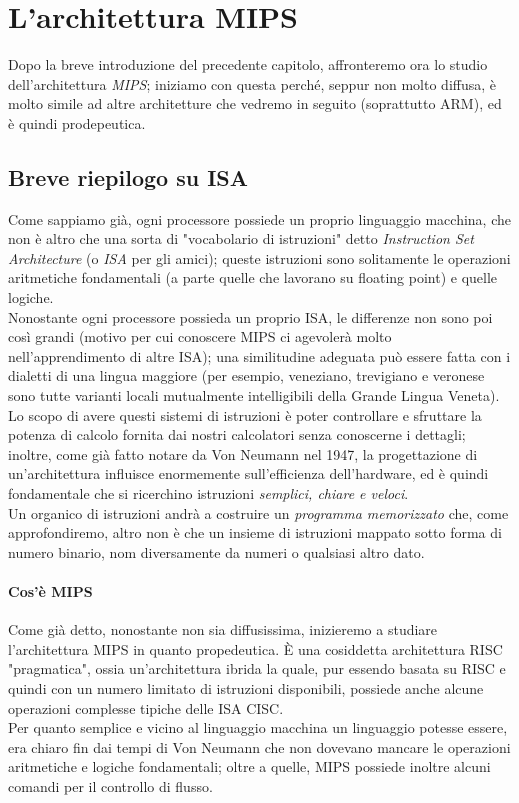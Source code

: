 \documentclass[class=book, crop=false]{standalone}
\begin{document}
\chapter{L'architettura MIPS}

Dopo la breve introduzione del precedente capitolo, affronteremo ora lo studio dell'architettura \emph{MIPS}; iniziamo con questa perché, seppur non molto diffusa, è molto simile ad altre architetture che vedremo in seguito (soprattutto ARM), ed è quindi prodepeutica.

\section{Breve riepilogo su ISA}
Come sappiamo già, ogni processore possiede un proprio linguaggio macchina, che non è altro che una sorta di "vocabolario di istruzioni" detto \emph{Instruction Set Architecture} (o \emph{ISA} per gli amici); queste istruzioni sono solitamente le operazioni aritmetiche fondamentali (a parte quelle che lavorano su floating point) e quelle logiche. \\
Nonostante ogni processore possieda un proprio ISA, le differenze non sono poi così grandi (motivo per cui conoscere MIPS ci agevolerà molto nell'apprendimento di altre ISA); una similitudine adeguata può essere fatta con i dialetti di una lingua maggiore (per esempio, veneziano, trevigiano e veronese sono tutte varianti locali mutualmente intelligibili della Grande Lingua Veneta).\\
Lo scopo di avere questi sistemi di istruzioni è poter controllare e sfruttare la potenza di calcolo fornita dai nostri calcolatori senza conoscerne i dettagli; inoltre, come già fatto notare da Von Neumann nel 1947, la progettazione di un'architettura influisce enormemente sull'efficienza dell'hardware, ed è quindi fondamentale che si ricerchino istruzioni \emph{semplici, chiare e veloci}.\\
Un organico di istruzioni andrà a costruire un \emph{programma memorizzato} che, come approfondiremo, altro non è che un insieme di istruzioni mappato sotto forma di numero binario, nom diversamente da numeri o qualsiasi altro dato.

\subsubsection{Cos'è MIPS}
Come già detto, nonostante non sia diffusissima, inizieremo a studiare l'architettura MIPS in quanto propedeutica. È una cosiddetta architettura RISC "pragmatica", ossia un'architettura ibrida la quale, pur essendo basata su RISC e quindi con un numero limitato di istruzioni disponibili, possiede anche alcune operazioni complesse tipiche delle ISA CISC.\\
Per quanto semplice e vicino al linguaggio macchina un linguaggio potesse essere, era chiaro fin dai tempi di Von Neumann che non dovevano mancare le operazioni aritmetiche e logiche fondamentali; oltre a quelle, MIPS possiede inoltre alcuni comandi per il controllo di flusso.
\end{document}
